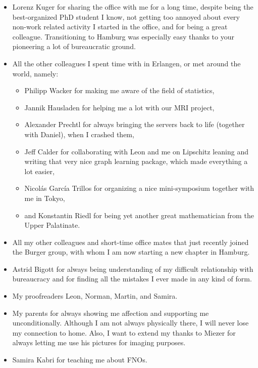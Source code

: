 {\begin{itemize}
%
\item Lorenz Kuger for sharing the office with me for a long time, despite being the best-organized PhD student I know, not getting too annoyed about every non-work related activity I started in the office, and for being a great colleague. Transitioning to Hamburg was especially easy thanks to your pioneering a lot of bureaucratic ground.
%
\item All the other colleagues I spent time with in Erlangen, or met around the world, namely:
\begin{itemize}
\item Philipp Wacker for making me aware of the field of statistics,
\item Jannik Hausladen for helping me a lot with our MRI project,
\item Alexander Prechtl for always bringing the servers back to life (together with Daniel), when I crashed them,
\item Jeff Calder for collaborating with Leon and me on Lipschitz leaning and writing that very nice graph learning package, which made everything a lot easier,
\item Nicolás García Trillos for organizing a nice mini-symposium together with me in Tokyo,
\item and Konstantin Riedl for being yet another great mathematician from the Upper Palatinate.
\end{itemize}
%
\item All my other colleagues and short-time office mates that just recently joined the Burger group, with whom I am now starting a new chapter in Hamburg.
%
\item Astrid Bigott for always being understanding of my difficult relationship with bureaucracy and for finding all the mistakes I ever made in any kind of form.
%
\item My proofreaders Leon, Norman, Martin, and Samira.
%
\item My parents for always showing me affection and supporting me unconditionally. Although I am not always physically there, I will never lose my connection to home. Also, I want to extend my thanks to Miezer for always letting me use his pictures for imaging purposes.
%
%
%
%
%
%
\item Samira Kabri for teaching me about FNOs. 
\end{itemize}
}